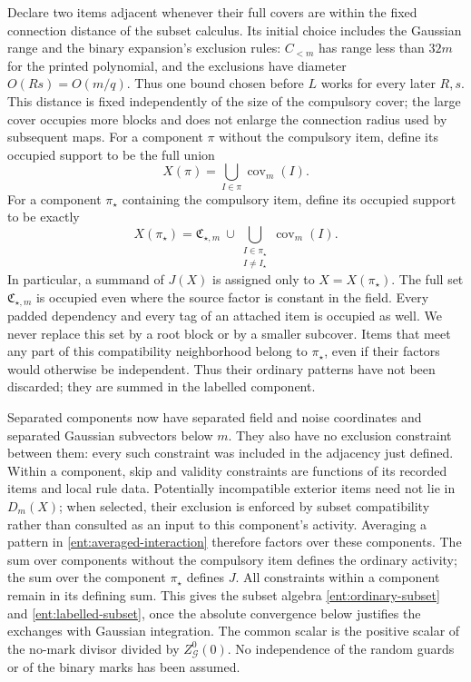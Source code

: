 Declare two items adjacent whenever their full covers are within
the fixed connection distance of the subset calculus.  Its initial
choice includes the Gaussian range and the binary expansion's
exclusion rules: \(C_{<m}\) has range less than \(32m\) for the
printed polynomial, and the exclusions have diameter
\(O(Rs)=O(m/q)\).  Thus one bound chosen before \(L\) works for
every later \(R,s\).  This distance is fixed
independently of the size of the compulsory cover; the large
cover occupies more blocks and does not enlarge the connection
radius used by subsequent maps.  For a component \(\pi\) without the
compulsory item, define its occupied support to be the full union
\begin{equation}\label{ent:occupied-cover}
             X(\pi)=\bigcup_{I\in\pi}\operatorname{cov}_m(I).
\end{equation}
For a component \(\pi_\star\) containing the compulsory item, define
its occupied support to be exactly
\begin{equation}\label{ent:occupied-label-cover}
 X(\pi_\star)=\mathfrak C_{\star,m}
       \ \cup\!
       \bigcup_{\substack{I\in\pi_\star\\I\ne I_\star}}
                        \operatorname{cov}_m(I).
\end{equation}
In particular, a summand of \(J(X)\) is assigned only to
\(X=X(\pi_\star)\).  The full set \(\mathfrak C_{\star,m}\) is
occupied even where the source factor is constant in the field.
Every padded dependency and every tag of an attached item is
occupied as well.  We never replace this set by a root block or
by a smaller subcover.  Items that meet any part of this
compatibility neighborhood belong to \(\pi_\star\), even if
their factors would otherwise be independent.  Thus their
ordinary patterns have not been discarded; they are summed in
the labelled component.

Separated components now have separated field and noise
coordinates and separated Gaussian subvectors below \(m\).
They also have no exclusion constraint between them: every
such constraint was included in the adjacency just defined.
Within a component, skip and validity constraints are functions of
its recorded items and local rule data.  Potentially incompatible
exterior items need not lie in \(D_m(X)\); when selected, their
exclusion is enforced by subset compatibility rather than consulted
as an input to this component's activity.
Averaging a pattern in \eqref{ent:averaged-interaction} therefore
factors over these components.  The sum over components without
the compulsory item defines the ordinary activity; the sum over
the component \(\pi_\star\) defines \(J\).  All constraints within
a component remain in its defining sum.  This gives the subset
algebra \eqref{ent:ordinary-subset} and
\eqref{ent:labelled-subset}, once the absolute convergence below
justifies the exchanges with Gaussian integration.  The common
scalar is the positive scalar of the no-mark divisor divided by
\(Z_{\mathcal G}^0(0)\).  No independence of the random guards
or of the binary marks has been assumed.

